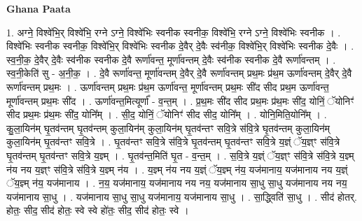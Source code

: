 \documentclass[17pt]{extarticle}
\begin{document}
\textbf{Ghana Paata } \newline

1. अग्ने॒ विश्वे॑भि॒र् विश्वे॑भि॒ रग्ने ऽग्ने॒ विश्वे॑भिः स्वनीक स्वनीक॒ विश्वे॑भि॒ रग्ने ऽग्ने॒ विश्वे॑भिः स्वनीक । . विश्वे॑भिः स्वनीक स्वनीक॒ विश्वे॑भि॒र् विश्वे॑भिः स्वनीक दे॒वैर् दे॒वैः स्व॑नीक॒ विश्वे॑भि॒र् विश्वे॑भिः स्वनीक दे॒वैः । . स्व॒नी॒क॒ दे॒वैर् दे॒वैः स्व॑नीक स्वनीक दे॒वै रूर्णा॑वन्त॒ मूर्णा॑वन्तम् दे॒वैः स्व॑नीक स्वनीक दे॒वै रूर्णा॑वन्तम् । . स्व॒नी॒केति॑ सु - अ॒नी॒क॒ । . दे॒वै रूर्णा॑वन्त॒ मूर्णा॑वन्तम् दे॒वैर् दे॒वै रूर्णा॑वन्तम् प्रथ॒मः प्र॑थ॒म ऊर्णा॑वन्तम् दे॒वैर् दे॒वै रूर्णा॑वन्तम् प्रथ॒मः । . ऊर्णा॑वन्तम् प्रथ॒मः प्र॑थ॒म ऊर्णा॑वन्त॒ मूर्णा॑वन्तम् प्रथ॒मः सी॑द सीद प्रथ॒म ऊर्णा॑वन्त॒ मूर्णा॑वन्तम् प्रथ॒मः सी॑द । . ऊर्णा॑वन्त॒मित्यूर्णा᳚ - व॒न्त॒म् । . प्र॒थ॒मः सी॑द सीद प्रथ॒मः प्र॑थ॒मः सी॑द॒ योनिं॒ ॅयोनिꣳ॑ सीद प्रथ॒मः प्र॑थ॒मः सी॑द॒ योनि᳚म् । . सी॒द॒ योनिं॒ ॅयोनिꣳ॑ सीद सीद॒ योनि᳚म् । . योनि॒मिति॒योनि᳚म् । . कु॒ला॒यिन॑म् घृ॒तव॑न्तम् घृ॒तव॑न्तम् कुला॒यिन॑म् कुला॒यिन॑म् घृ॒तव॑न्तꣳ सवि॒त्रे स॑वि॒त्रे घृ॒तव॑न्तम् कुला॒यिन॑म् कुला॒यिन॑म् घृ॒तव॑न्तꣳ सवि॒त्रे । . घृ॒तव॑न्तꣳ सवि॒त्रे स॑वि॒त्रे घृ॒तव॑न्तम् घृ॒तव॑न्तꣳ सवि॒त्रे य॒ज्ञ्ं ॅय॒ज्ञ्ꣳ स॑वि॒त्रे घृ॒तव॑न्तम् घृ॒तव॑न्तꣳ सवि॒त्रे य॒ज्ञ्म् । . घृ॒तव॑न्त॒मिति॑ घृ॒त - व॒न्त॒म् । . स॒वि॒त्रे य॒ज्ञ्ं ॅय॒ज्ञ्ꣳ स॑वि॒त्रे स॑वि॒त्रे य॒ज्ञ्म् न॑य नय य॒ज्ञ्ꣳ स॑वि॒त्रे स॑वि॒त्रे य॒ज्ञ्म् न॑य । . य॒ज्ञ्म् न॑य नय य॒ज्ञ्ं ॅय॒ज्ञ्म् न॑य॒ यज॑मानाय॒ यज॑मानाय नय य॒ज्ञ्ं ॅय॒ज्ञ्म् न॑य॒ यज॑मानाय । . न॒य॒ यज॑मानाय॒ यज॑मानाय नय नय॒ यज॑मानाय सा॒धु सा॒धु यज॑मानाय नय नय॒ यज॑मानाय सा॒धु । . यज॑मानाय सा॒धु सा॒धु यज॑मानाय॒ यज॑मानाय सा॒धु । . सा॒द्ध्विति॑ सा॒धु । . सीद॑ होतर्. होतः॒ सीद॒ सीद॑ होतः॒ स्वे स्वे हो॑तः॒ सीद॒ सीद॑ होतः॒ स्वे । \newline
\end{document}
